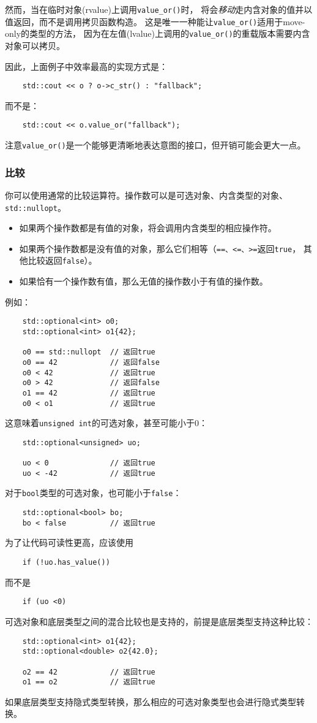 然而，当在临时对象(rvalue)上调用\texttt{value\_or()}时，
将会\emph{移动}走内含对象的值并以值返回，而不是调用拷贝函数构造。
这是唯一一种能让\texttt{value\_or()}适用于move-only的类型的方法，
因为在左值(lvalue)上调用的\texttt{value\_or()}的重载版本需要内含对象可以拷贝。

因此，上面例子中效率最高的实现方式是：
\begin{lstlisting}
    std::cout << o ? o->c_str() : "fallback";
\end{lstlisting}
而不是：
\begin{lstlisting}
    std::cout << o.value_or("fallback");
\end{lstlisting}
注意\texttt{value\_or()}是一个能够更清晰地表达意图的接口，但开销可能会更大一点。

\subsubsection*{比较}
你可以使用通常的比较运算符。操作数可以是可选对象、内含类型的对象、\texttt{std::nullopt}。
\begin{itemize}[leftmargin=*]
    \item 如果两个操作数都是有值的对象，将会调用内含类型的相应操作符。
    \item 如果两个操作数都是没有值的对象，那么它们相等（\texttt{==、<=、>=}返回\texttt{true}，
    其他比较返回\texttt{false}）。
    \item 如果恰有一个操作数有值，那么无值的操作数小于有值的操作数。
\end{itemize}
例如：
\begin{lstlisting}
    std::optional<int> o0;
    std::optional<int> o1{42};

    o0 == std::nullopt  // 返回true
    o0 == 42            // 返回false
    o0 < 42             // 返回true
    o0 > 42             // 返回false
    o1 == 42            // 返回true
    o0 < o1             // 返回true
\end{lstlisting}
这意味着\texttt{unsigned int}的可选对象，甚至可能小于0：
\begin{lstlisting}
    std::optional<unsigned> uo;

    uo < 0              // 返回true
    uo < -42            // 返回true
\end{lstlisting}
对于\texttt{bool}类型的可选对象，也可能小于\texttt{false}：
\begin{lstlisting}
    std::optional<bool> bo;
    bo < false          // 返回true
\end{lstlisting}
为了让代码可读性更高，应该使用
\begin{lstlisting}
    if (!uo.has_value())
\end{lstlisting}
而不是
\begin{lstlisting}
    if (uo <0)
\end{lstlisting}
可选对象和底层类型之间的混合比较也是支持的，前提是底层类型支持这种比较：
\begin{lstlisting}
    std::optional<int> o1{42};
    std::optional<double> o2{42.0};

    o2 == 42            // 返回true
    o1 == o2            // 返回true
\end{lstlisting}
如果底层类型支持隐式类型转换，那么相应的可选对象类型也会进行隐式类型转换。

